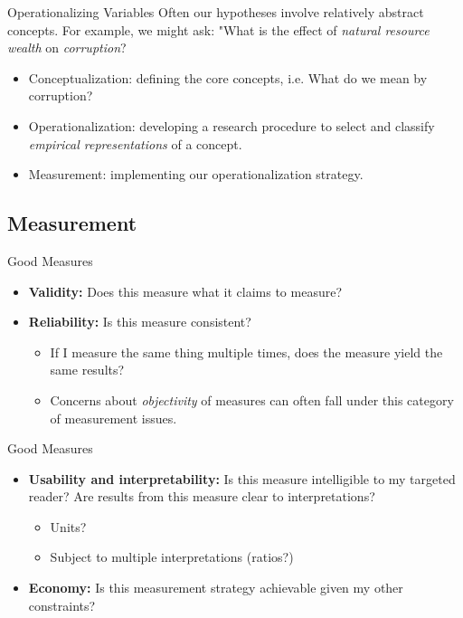 \documentclass{beamer}
\begin{document}
\begin{frame}{Operationalizing Variables}
Often our hypotheses involve relatively abstract concepts. For example, we might ask: "What is the effect of \textit{natural resource wealth} on \textit{corruption}? 
\begin{itemize}
    \item Conceptualization: defining the core concepts, i.e. What do we mean by corruption? 
    \item Operationalization: developing a research procedure to select and classify \textit{empirical representations} of a concept. 
    \item Measurement: implementing our operationalization strategy. 
\end{itemize}
\end{frame} 


\subsection{Measurement}
\begin{frame}{Good Measures}
\begin{itemize}
\item \textbf{Validity:} Does this measure what it claims to measure?
\item \textbf{Reliability:} Is this measure consistent? 
\begin{itemize}
    \item If I measure the same thing multiple times, does the measure yield the same results?
    \item Concerns about \textit{objectivity} of measures can often fall under this category of measurement issues.  
\end{itemize} 
\end{itemize}
\end{frame}

\begin{frame}{Good Measures}
\begin{itemize}
\item \textbf{Usability and interpretability:} Is this measure intelligible to my targeted reader? Are results from this measure clear to interpretations? 
\begin{itemize}
    \item Units?
    \item Subject to multiple interpretations (ratios?) 
\end{itemize}
\item \textbf{Economy:} Is this measurement strategy achievable given my other constraints?
\end{itemize} 
\end{frame}
\end{document}
